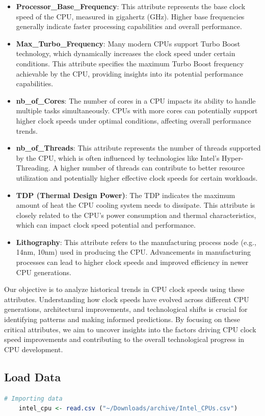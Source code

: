 \begin{itemize}
    \item \textbf{Processor\_Base\_Frequency}: This attribute represents the base clock speed of the CPU, measured in gigahertz (GHz). Higher base frequencies generally indicate faster processing capabilities and overall performance.
    \item \textbf{Max\_Turbo\_Frequency}: Many modern CPUs support Turbo Boost technology, which dynamically increases the clock speed under certain conditions. This attribute specifies the maximum Turbo Boost frequency achievable by the CPU, providing insights into its potential performance capabilities.
    \item \textbf{nb\_of\_Cores}: The number of cores in a CPU impacts its ability to handle multiple tasks simultaneously. CPUs with more cores can potentially support higher clock speeds under optimal conditions, affecting overall performance trends.
    \item \textbf{nb\_of\_Threads}: This attribute represents the number of threads supported by the CPU, which is often influenced by technologies like Intel's Hyper-Threading. A higher number of threads can contribute to better resource utilization and potentially higher effective clock speeds for certain workloads.
    \item \textbf{TDP (Thermal Design Power)}: The TDP indicates the maximum amount of heat the CPU cooling system needs to dissipate. This attribute is closely related to the CPU's power consumption and thermal characteristics, which can impact clock speed potential and performance.
    \item \textbf{Lithography}: This attribute refers to the manufacturing process node (e.g., 14nm, 10nm) used in producing the CPU. Advancements in manufacturing processes can lead to higher clock speeds and improved efficiency in newer CPU generations.
\end{itemize}

Our objective is to analyze historical trends in CPU clock speeds using these attributes. Understanding how clock speeds have evolved across different CPU generations, architectural improvements, and technological shifts is crucial for identifying patterns and making informed predictions. By focusing on these critical attributes, we aim to uncover insights into the factors driving CPU clock speed improvements and contributing to the overall technological progress in CPU development.

\subsection{Load Data}
\begin{lstlisting}[language=R]
    # Importing data 
    intel_cpu <- read.csv ("~/Downloads/archive/Intel_CPUs.csv")
\end{lstlisting}

